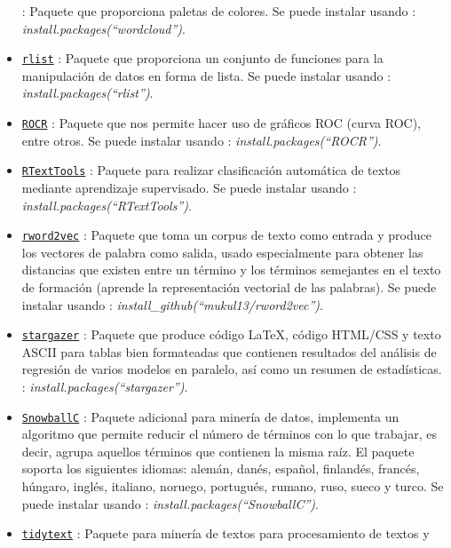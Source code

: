 \documentclass[spanish,]{article}
\begin{document}
\begin{itemize}
  : Paquete que proporciona paletas de colores. Se puede instalar usando
  : \emph{install.packages(``wordcloud'')}.
\item
  \href{https://cran.r-project.org/web/packages/rlist/rlist.pdf}{\texttt{rlist}}
  : Paquete que proporciona un conjunto de funciones para la
  manipulación de datos en forma de lista. Se puede instalar usando :
  \emph{install.packages(``rlist'')}.
\item
  \href{https://cran.r-project.org/web/packages/ROCR/ROCR.pdf}{\texttt{ROCR}}
  : Paquete que nos permite hacer uso de gráficos ROC (curva ROC), entre
  otros. Se puede instalar usando : \emph{install.packages(``ROCR'')}.
\item
  \href{https://cran.r-project.org/web/packages/RTextTools/RTextTools.pdf}{\texttt{RTextTools}}
  : Paquete para realizar clasificación automática de textos mediante
  aprendizaje supervisado. Se puede instalar usando :
  \emph{install.packages(``RTextTools'')}.
\item
  \href{https://github.com/mukul13/rword2vec}{\texttt{rword2vec}} :
  Paquete que toma un corpus de texto como entrada y produce los
  vectores de palabra como salida, usado especialmente para obtener las
  distancias que existen entre un término y los términos semejantes en
  el texto de formación (aprende la representación vectorial de las
  palabras). Se puede instalar usando :
  \emph{install\_github(``mukul13/rword2vec'')}.
\item
  \href{https://cran.r-project.org/web/packages/stargazer/stargazer.pdf}{\texttt{stargazer}}
  : Paquete que produce código LaTeX, código HTML/CSS y texto ASCII para
  tablas bien formateadas que contienen resultados del análisis de
  regresión de varios modelos en paralelo, así como un resumen de
  estadísticas. : \emph{install.packages(``stargazer'')}.
\item
  \href{https://cran.r-project.org/web/packages/SnowballC/SnowballC.pdf}{\texttt{SnowballC}}
  : Paquete adicional para minería de datos, implementa un algoritmo que
  permite reducir el número de términos con lo que trabajar, es decir,
  agrupa aquellos términos que contienen la misma raíz. El paquete
  soporta los siguientes idiomas: alemán, danés, español, finlandés,
  francés, húngaro, inglés, italiano, noruego, portugués, rumano, ruso,
  sueco y turco. Se puede instalar usando :
  \emph{install.packages(``SnowballC'')}.
\item
  \href{https://cran.r-project.org/web/packages/tidytext/tidytext.pdf}{\texttt{tidytext}}
  : Paquete para minería de textos para procesamiento de textos y

\end{itemize}
\end{document}
